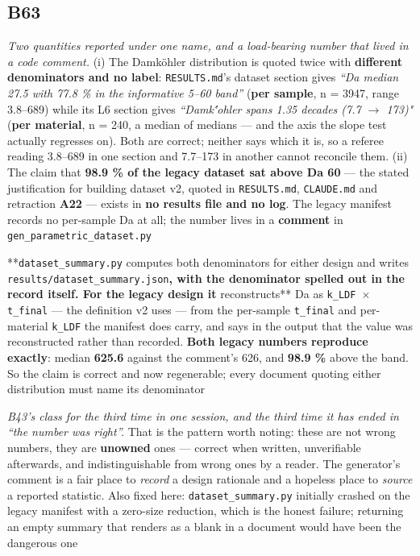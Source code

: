 \documentclass[10pt]{article}
\begin{document}
\subsection*{B63}\label{led:B63}
\begin{description}[leftmargin=0pt,itemsep=1pt]
\item[Defect.] \emph{Two quantities reported under one name, and a load-bearing number that lived in a code comment.} (i) The Damk\"ohler distribution is quoted twice with \textbf{different denominators and no label}: \texttt{RESULTS.md}'s dataset section gives \emph{``Da median 27.5 with 77.8 \% in the informative 5--60 band''} (\textbf{per sample}, n = 3947, range 3.8--689) while its L6 section gives \emph{``Damk\''ohler spans 1.35 decades (7.7 $\rightarrow$ 173)"} (\textbf{per material}, n = 240, a median of medians --- and the axis the slope test actually regresses on). Both are correct; neither says which it is, so a referee reading 3.8--689 in one section and 7.7--173 in another cannot reconcile them. (ii) The claim that \textbf{98.9 \% of the legacy dataset sat above Da 60} --- the stated justification for building dataset v2, quoted in \texttt{RESULTS.md}, \texttt{CLAUDE.md} and retraction \textbf{A22} --- exists in \textbf{no results file and no log}. The legacy manifest records no per-sample Da at all; the number lives in a \textbf{comment} in \texttt{gen\_parametric\_dataset.py}
\item[Resolution.] **\texttt{dataset\_summary.py} computes both denominators for either design and writes \texttt{results/dataset\_summary.json}\textbf{, with the denominator spelled out in the record itself. For the legacy design it }reconstructs** Da as \texttt{k\_LDF $\times$ t\_final} --- the definition v2 uses --- from the per-sample \texttt{t\_final} and per-material \texttt{k\_LDF} the manifest does carry, and says in the output that the value was reconstructed rather than recorded. \textbf{Both legacy numbers reproduce exactly}: median \textbf{625.6} against the comment's 626, and \textbf{98.9 \%} above the band. So the claim is correct and now regenerable; every document quoting either distribution must name its denominator
\item[Note.] \emph{B43's class for the third time in one session, and the third time it has ended in ``the number was right''.} That is the pattern worth noting: these are not wrong numbers, they are \textbf{unowned} ones --- correct when written, unverifiable afterwards, and indistinguishable from wrong ones by a reader. The generator's comment is a fair place to \emph{record} a design rationale and a hopeless place to \emph{source} a reported statistic. Also fixed here: \texttt{dataset\_summary.py} initially crashed on the legacy manifest with a zero-size reduction, which is the honest failure; returning an empty summary that renders as a blank in a document would have been the dangerous one
\end{description}
\end{document}
